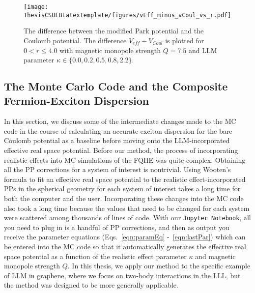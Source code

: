     \begin{figure}[H]
    \begin{center}
    \texttt{[image: ThesisCSULBLatexTemplate/figures/vEff\_minus\_vCoul\_vs\_r.pdf]}
    \caption[The difference between the modified Park potential and the Coulomb potential.]{The difference between the modified Park potential and the Coulomb potential. The difference $V_{eff}-V_{Coul}$ is plotted for $0<r\leq4.0$ with magnetic monopole strength $Q=7.5$ and LLM parameter $\kappa\in\{0.0,0.2,0.5,0.8,2.2\}$.}
    \label{fig:vEff_minus_vCoul_vs_r} 
    \end{center}
    \end{figure}
    
    \subsection{The Monte Carlo Code and the Composite Fermion-Exciton Dispersion} \label{ssec:compFermExcDisp}
    
    In this section, we discuss some of the intermediate changes made to the MC code in the course of calculating an accurate exciton dispersion for the bare Coulomb potential as a baseline before moving onto the LLM-incorporated effective real space potential. Before our method, the process of incorporating realistic effects into MC simulations of the FQHE was quite complex. Obtaining all the PP corrections for a system of interest is nontrivial. Using Wooten's formula to fit an effective real space potential to the realistic effect-incorporated PPs in the spherical geometry for each system of interest takes a long time for both the computer and the user. Incorporating these changes into the MC code also took a long time because the values that need to be changed for each system were scattered among thousands of lines of code. With our \texttt{Jupyter Notebook}, all you need to plug in is a handful of PP corrections, and then as output you receive the parameter equations (Eqs.~\ref{eqn:paramEq} -~\ref{eqn:lastPar}) which can be entered into the MC code so that it automatically generates the effective real space potential as a function of the realistic effect parameter $\kappa$ and magnetic monopole strength $Q$. In this thesis, we apply our method to the specific example of LLM in graphene, where we focus on two-body interactions in the LLL, but the method was designed to be more generally applicable. 
    
